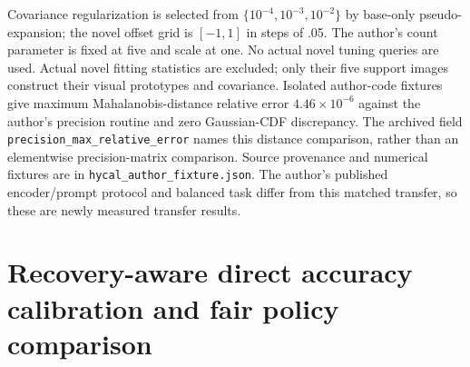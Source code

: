 \documentclass[preprint,review,12pt]{elsarticle}
\begin{document}
Covariance regularization is selected from $\{10^{-4},10^{-3},10^{-2}\}$ by base-only pseudo-expansion; the novel offset grid is $[-1,1]$ in steps of .05. The author's count parameter is fixed at five and scale at one. No actual novel tuning queries are used. Actual novel fitting statistics are excluded; only their five support images construct their visual prototypes and covariance. Isolated author-code fixtures give maximum Mahalanobis-distance relative error $4.46\times10^{-6}$ against the author's precision routine and zero Gaussian-CDF discrepancy. The archived field \nolinkurl{precision_max_relative_error} names this distance comparison, rather than an elementwise precision-matrix comparison. Source provenance and numerical fixtures are in \nolinkurl{hycal_author_fixture.json}. The author's published encoder/prompt protocol and balanced task differ from this matched transfer, so these are newly measured transfer results.

\begin{table}[htbp]
\centering\setlength{\belowcaptionskip}{8pt}
\caption{Controlled HyCal transfer: unrestricted average incremental macro accuracy and final descriptive novel capacity at the common 95\% base requirement (\%). Capacity averages partitions feasible in both orders; HyCal feasible reports that count, and -- denotes none. Unequal feasible sets are not paired accuracy comparisons.}
\resizebox{\linewidth}{!}{}
\end{table}

\FloatBarrier
\section{Recovery-aware direct accuracy calibration and fair policy comparison}
\label{app:pairedrevision}

\end{document}
